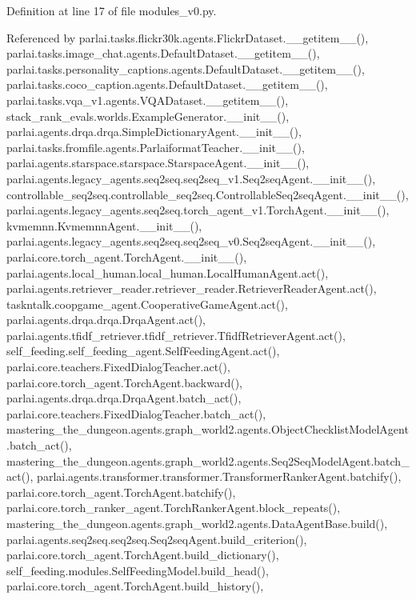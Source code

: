 Definition at line 17 of file modules\+\_\+v0.\+py.



Referenced by parlai.\+tasks.\+flickr30k.\+agents.\+Flickr\+Dataset.\+\_\+\+\_\+getitem\+\_\+\+\_\+(), parlai.\+tasks.\+image\+\_\+chat.\+agents.\+Default\+Dataset.\+\_\+\+\_\+getitem\+\_\+\+\_\+(), parlai.\+tasks.\+personality\+\_\+captions.\+agents.\+Default\+Dataset.\+\_\+\+\_\+getitem\+\_\+\+\_\+(), parlai.\+tasks.\+coco\+\_\+caption.\+agents.\+Default\+Dataset.\+\_\+\+\_\+getitem\+\_\+\+\_\+(), parlai.\+tasks.\+vqa\+\_\+v1.\+agents.\+V\+Q\+A\+Dataset.\+\_\+\+\_\+getitem\+\_\+\+\_\+(), stack\+\_\+rank\+\_\+evals.\+worlds.\+Example\+Generator.\+\_\+\+\_\+init\+\_\+\+\_\+(), parlai.\+agents.\+drqa.\+drqa.\+Simple\+Dictionary\+Agent.\+\_\+\+\_\+init\+\_\+\+\_\+(), parlai.\+tasks.\+fromfile.\+agents.\+Parlaiformat\+Teacher.\+\_\+\+\_\+init\+\_\+\+\_\+(), parlai.\+agents.\+starspace.\+starspace.\+Starspace\+Agent.\+\_\+\+\_\+init\+\_\+\+\_\+(), parlai.\+agents.\+legacy\+\_\+agents.\+seq2seq.\+seq2seq\+\_\+v1.\+Seq2seq\+Agent.\+\_\+\+\_\+init\+\_\+\+\_\+(), controllable\+\_\+seq2seq.\+controllable\+\_\+seq2seq.\+Controllable\+Seq2seq\+Agent.\+\_\+\+\_\+init\+\_\+\+\_\+(), parlai.\+agents.\+legacy\+\_\+agents.\+seq2seq.\+torch\+\_\+agent\+\_\+v1.\+Torch\+Agent.\+\_\+\+\_\+init\+\_\+\+\_\+(), kvmemnn.\+Kvmemnn\+Agent.\+\_\+\+\_\+init\+\_\+\+\_\+(), parlai.\+agents.\+legacy\+\_\+agents.\+seq2seq.\+seq2seq\+\_\+v0.\+Seq2seq\+Agent.\+\_\+\+\_\+init\+\_\+\+\_\+(), parlai.\+core.\+torch\+\_\+agent.\+Torch\+Agent.\+\_\+\+\_\+init\+\_\+\+\_\+(), parlai.\+agents.\+local\+\_\+human.\+local\+\_\+human.\+Local\+Human\+Agent.\+act(), parlai.\+agents.\+retriever\+\_\+reader.\+retriever\+\_\+reader.\+Retriever\+Reader\+Agent.\+act(), taskntalk.\+coopgame\+\_\+agent.\+Cooperative\+Game\+Agent.\+act(), parlai.\+agents.\+drqa.\+drqa.\+Drqa\+Agent.\+act(), parlai.\+agents.\+tfidf\+\_\+retriever.\+tfidf\+\_\+retriever.\+Tfidf\+Retriever\+Agent.\+act(), self\+\_\+feeding.\+self\+\_\+feeding\+\_\+agent.\+Self\+Feeding\+Agent.\+act(), parlai.\+core.\+teachers.\+Fixed\+Dialog\+Teacher.\+act(), parlai.\+core.\+torch\+\_\+agent.\+Torch\+Agent.\+backward(), parlai.\+agents.\+drqa.\+drqa.\+Drqa\+Agent.\+batch\+\_\+act(), parlai.\+core.\+teachers.\+Fixed\+Dialog\+Teacher.\+batch\+\_\+act(), mastering\+\_\+the\+\_\+dungeon.\+agents.\+graph\+\_\+world2.\+agents.\+Object\+Checklist\+Model\+Agent.\+batch\+\_\+act(), mastering\+\_\+the\+\_\+dungeon.\+agents.\+graph\+\_\+world2.\+agents.\+Seq2\+Seq\+Model\+Agent.\+batch\+\_\+act(), parlai.\+agents.\+transformer.\+transformer.\+Transformer\+Ranker\+Agent.\+batchify(), parlai.\+core.\+torch\+\_\+agent.\+Torch\+Agent.\+batchify(), parlai.\+core.\+torch\+\_\+ranker\+\_\+agent.\+Torch\+Ranker\+Agent.\+block\+\_\+repeats(), mastering\+\_\+the\+\_\+dungeon.\+agents.\+graph\+\_\+world2.\+agents.\+Data\+Agent\+Base.\+build(), parlai.\+agents.\+seq2seq.\+seq2seq.\+Seq2seq\+Agent.\+build\+\_\+criterion(), parlai.\+core.\+torch\+\_\+agent.\+Torch\+Agent.\+build\+\_\+dictionary(), self\+\_\+feeding.\+modules.\+Self\+Feeding\+Model.\+build\+\_\+head(), parlai.\+core.\+torch\+\_\+agent.\+Torch\+Agent.\+build\+\_\+history(), 